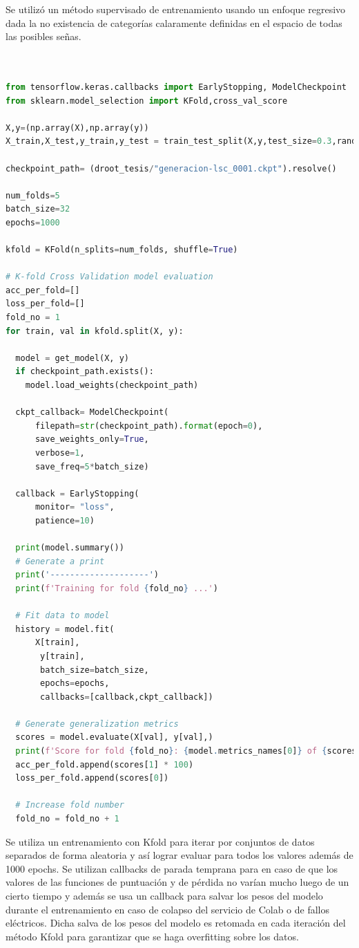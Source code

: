 Se utilizó un método supervisado de entrenamiento usando un enfoque regresivo dada la no existencia de categorías calaramente definidas en el espacio de todas las posibles señas.
\begin{lstlisting}[language=Python, caption={Graficar la animación }]


from tensorflow.keras.callbacks import EarlyStopping, ModelCheckpoint
from sklearn.model_selection import KFold,cross_val_score

X,y=(np.array(X),np.array(y))
X_train,X_test,y_train,y_test = train_test_split(X,y,test_size=0.3,random_state=42)

checkpoint_path= (droot_tesis/"generacion-lsc_0001.ckpt").resolve()

num_folds=5
batch_size=32
epochs=1000

kfold = KFold(n_splits=num_folds, shuffle=True)

# K-fold Cross Validation model evaluation
acc_per_fold=[]
loss_per_fold=[]
fold_no = 1
for train, val in kfold.split(X, y):

  model = get_model(X, y)
  if checkpoint_path.exists():
    model.load_weights(checkpoint_path)

  ckpt_callback= ModelCheckpoint(
      filepath=str(checkpoint_path).format(epoch=0),
      save_weights_only=True,
      verbose=1,
      save_freq=5*batch_size)
  
  callback = EarlyStopping(
      monitor= "loss",
      patience=10)
  
  print(model.summary())
  # Generate a print
  print('--------------------')
  print(f'Training for fold {fold_no} ...')

  # Fit data to model
  history = model.fit(
      X[train],
       y[train],
       batch_size=batch_size,
       epochs=epochs,
       callbacks=[callback,ckpt_callback])

  # Generate generalization metrics
  scores = model.evaluate(X[val], y[val],)
  print(f'Score for fold {fold_no}: {model.metrics_names[0]} of {scores[0]}; {model.metrics_names[1]} of {scores[1]*100}%')
  acc_per_fold.append(scores[1] * 100)
  loss_per_fold.append(scores[0])

  # Increase fold number
  fold_no = fold_no + 1

\end{lstlisting}

Se utiliza un entrenamiento con Kfold para iterar por conjuntos de datos separados de forma aleatoria y así lograr evaluar para todos los valores además de 1000 epochs.
Se utilizan callbacks de parada temprana para en caso de que los valores de las funciones de puntuación y de pérdida no varían mucho luego de un cierto tiempo y además se usa un callback para salvar los pesos del modelo durante el entrenamiento en caso de colapso del servicio de Colab o de fallos eléctricos. 
Dicha salva de los pesos del modelo es retomada en cada iteración del método Kfold para garantizar que se haga overfitting sobre los datos.

